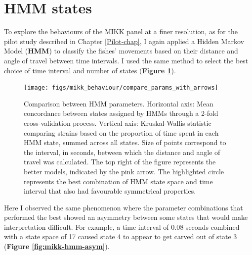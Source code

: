 \documentclass[
]{book}
\begin{document}
\clearpage

\hypertarget{hmm-states}{%
\section{HMM states}\label{hmm-states}}

To explore the behaviours of the MIKK panel at a finer resolution, as for the pilot study described in Chapter \ref{Pilot-chap}, I again applied a Hidden Markov Model (\textbf{HMM}) to classify the fishes' movements based on their distance and angle of travel between time intervals. I used the same method to select the best choice of time interval and number of states (\textbf{Figure \ref{fig:mikk-param-comp}}).



\begin{figure}
\texttt{[image: figs/mikk\_behaviour/compare\_params\_with\_arrows]} \caption{Comparison between HMM parameters. Horizontal axis: Mean concordance between states assigned by HMMs through a 2-fold cross-validation process. Vertical axis: Kruskal-Wallis statistic comparing strains based on the proportion of time spent in each HMM state, summed across all states. Size of points correspond to the interval, in seconds, between which the distance and angle of travel was calculated. The top right of the figure represents the better models, indicated by the pink arrow. The highlighted circle represents the best combination of HMM state space and time interval that also had favourable symmetrical properties.}\label{fig:mikk-param-comp}
\end{figure}

Here I observed the same phenomenon where the parameter combinations that performed the best showed an asymmetry between some states that would make interpretation difficult. For example, a time interval of 0.08 seconds combined with a state space of 17 caused state 4 to appear to get carved out of state 3 (\textbf{Figure \ref{fig:mikk-hmm-asym}}).
\end{document}
